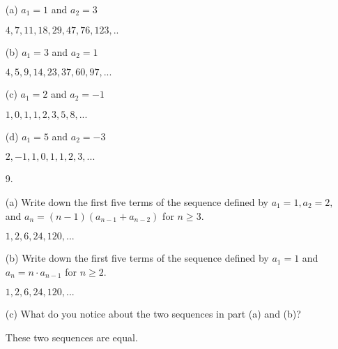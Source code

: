 \documentclass{article}
\begin{document}
\begin{itemize}
    (a) $a_1=1$ and $a_2=3$
    
    {\color{blue}$4,7,11,18,29,47,76,123,..$}
    
    (b) $a_1=3$ and $a_2=1$
    
    {\color{blue}$4,5,9,14,23,37,60,97,...$}
    
    (c) $a_1=2$ and $a_2=-1$
    
    {\color{blue}$1,0,1,1,2,3,5,8,...$}
    
    (d) $a_1=5$ and $a_2=-3$
    
    {\color{blue}$2,-1,1,0,1,1,2,3,...$}
    
    \item[9.] 
    
    (a) Write down the first five terms of the sequence defined by $a_1=1, a_2=2,$ and $a_n=(n-1)(a_{n-1}+a_{n-2})$ for $n\geq3$.
    
    {\color{blue} $1,2,6,24,120,...$}
    
    (b) Write down the first five terms of the sequence defined by $a_1=1$ and $a_n=n\cdot a_{n-1}$ for $n\geq2$.
    
    {\color{blue} $1,2,6,24,120,...$}
    
    (c) What do you notice about the two sequences in part (a) and (b)?
    
    {\color{blue} These two sequences are equal.}
\end{itemize}
\end{document}
